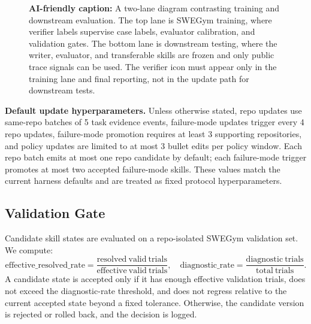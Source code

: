 \documentclass{article}
\begin{document}
\begin{figure}[t]
\begin{center}
\end{center}
\caption{\textbf{AI-friendly caption:} A two-lane diagram contrasting training
and downstream evaluation. The top lane is SWEGym training, where verifier
labels supervise case labels, evaluator calibration, and validation gates. The
bottom lane is downstream testing, where the writer, evaluator, and transferable
skills are frozen and only public trace signals can be used. The verifier icon
must appear only in the training lane and final reporting, not in the update
path for downstream tests.}
\label{fig:verifier-boundary}
\end{figure}

\noindent\textbf{Default update hyperparameters.}
Unless otherwise stated, repo updates use same-repo batches of 5 task evidence
events, failure-mode updates trigger every 4 repo updates, failure-mode
promotion requires at least 3 supporting repositories, and policy updates are
limited to at most 3 bullet edits per policy window. Each repo batch emits at
most one repo candidate by default; each failure-mode trigger promotes at most
two accepted failure-mode skills. These values match the current harness
defaults and are treated as fixed protocol hyperparameters.

\subsection{Validation Gate}

Candidate skill states are evaluated on a repo-isolated SWEGym validation set.
We compute:
\[
\mathrm{effective\_resolved\_rate}
=
\frac{\mathrm{resolved\ valid\ trials}}{\mathrm{effective\ valid\ trials}},
\quad
\mathrm{diagnostic\_rate}
=
\frac{\mathrm{diagnostic\ trials}}{\mathrm{total\ trials}}.
\]
A candidate state is accepted only if it has enough effective validation trials,
does not exceed the diagnostic-rate threshold, and does not regress relative to
the current accepted state beyond a fixed tolerance. Otherwise, the candidate
version is rejected or rolled back, and the decision is logged.
\end{document}
